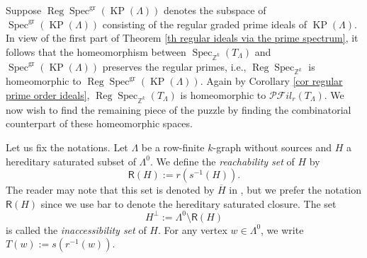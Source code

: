 \documentclass[a4paper,reqno,12pt]{amsart}
\numberwithin{equation}{section}
\theoremstyle{definition}
\theoremstyle{remark}
\newcommand{\Spec}{\operatorname{Spec}}
\newcommand{\reg}{\operatorname{Reg}}
\newcommand{\gr}{\operatorname{gr}}
\newcommand{\KP}{\operatorname{KP}}
\begin{document}
Suppose $\reg\Spec^{\gr}(\KP(\Lambda))$ denotes the subspace of $\Spec^{\gr}(\KP(\Lambda))$ consisting of the regular graded prime ideals of $\KP(\Lambda)$. In view of the first part of Theorem \ref{th regular ideals via the prime spectrum}, it follows that the homeomorphism between $\Spec_{\mathbb{Z}^k}(T_\Lambda)$ and $\Spec^{\gr}(\KP(\Lambda))$ preserves the regular primes, i.e., $\reg\Spec_{\mathbb{Z}^k}$ is homeomorphic to $\reg\Spec^{\gr}(\KP(\Lambda))$. Again by Corollary \ref{cor regular prime order ideals}, $\reg\Spec_{\mathbb{Z}^k}(T_\Lambda)$ is homeomorphic to $\mathscr{P}\mathscr{F}il_r(T_\Lambda)$. We now wish to find the remaining piece of the puzzle by finding the combinatorial counterpart of these homeomorphic spaces. 

Let us fix the notations. Let $\Lambda$ be a row-finite $k$-graph without sources and $H$ a hereditary saturated subset of $\Lambda^0$. We define the \emph{reachability set} of $H$ by 
\begin{equation}\label{eq reachability}
\mathsf{R}(H):=r(s^{-1}(H)).
\end{equation}
The reader may note that this set is denoted by $\overline{H}$ in \cite{Schenkel}, but we prefer the notation $\mathsf{R}(H)$ since we use \textsf{bar} to denote the hereditary saturated closure. The set 
\begin{equation}\label{eq inaccessibility}
H^\perp:=\Lambda^0\setminus \mathsf{R}(H)
\end{equation}
is called the \emph{inaccessibility set} of $H$. For any vertex $w\in \Lambda^0$, we write $T(w):=s(r^{-1}(w))$. 
\end{document}
